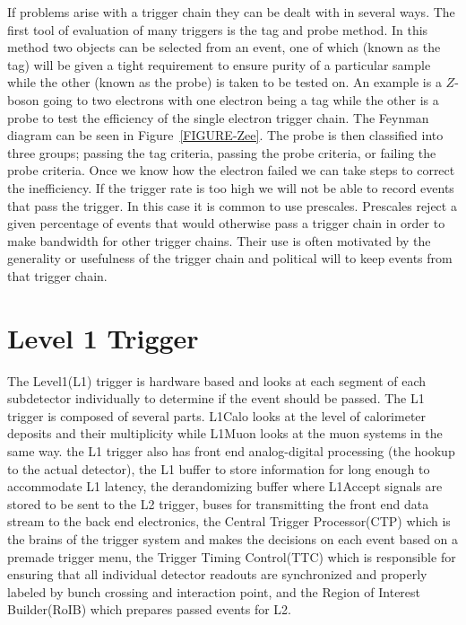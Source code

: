 
If problems arise with a trigger chain they can be dealt with in several ways. The first tool of evaluation of many triggers is the tag and probe method. In this method two objects can be selected from an event, one of which (known as the tag) will be given a tight requirement to ensure purity of a particular sample while the other (known as the probe) is taken to be tested on. An example is a $Z$-boson going to two electrons with one electron being a tag while the other is a probe to test the efficiency of the single electron trigger chain. The Feynman diagram can be seen in Figure~\ref{FIGURE-Zee}. The probe is then classified into three groups; passing the tag criteria, passing the probe criteria, or failing the probe criteria. Once we know how the electron failed we can take steps to correct the inefficiency. If the trigger rate is too high we will not be able to record events that pass the trigger. In this case it is common to use prescales. Prescales reject a given percentage of events that would otherwise pass a trigger chain in order to make bandwidth for other trigger chains. Their use is often motivated by the generality or usefulness of the trigger chain and political will to keep events from that trigger chain.


\section{Level 1 Trigger}
\label{SECTION-TRIGGERS-L1}

The Level1(L1) trigger is hardware based and looks at each segment of each subdetector individually to determine if the event should be passed. The L1 trigger is composed of several parts. L1Calo looks at the level of calorimeter deposits and their multiplicity while L1Muon looks at the muon systems in the same way. the L1 trigger also has front end analog-digital processing (the hookup to the actual detector), the L1 buffer to store information for long enough to accommodate L1 latency, the derandomizing buffer where L1Accept signals are stored to be sent to the L2 trigger, buses for transmitting the front end data stream to the back end electronics, the Central Trigger Processor(CTP) which is the brains of the trigger system and makes the decisions on each event based on a premade trigger menu, the Trigger Timing Control(TTC) which is responsible for ensuring that all individual detector readouts are synchronized and properly labeled by bunch crossing and interaction point, and the Region of Interest Builder(RoIB) which prepares passed events for L2. 

